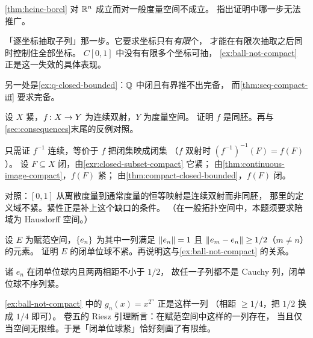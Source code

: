\begin{exercise}[结构]
  \label{exr:why-not-general}
  \cref{thm:heine-borel} 对 \(\mathbb{R}^{n}\) 成立而对一般度量空间不成立。
  指出证明中哪一步无法推广。
  \begin{solution}
    「逐坐标抽取子列」那一步。它要求坐标只有\emph{有限}个，
    才能在有限次抽取之后同时控制住全部坐标。
    \(C[0,1]\) 中没有有限多个坐标可抽，
    \cref{ex:ball-not-compact} 正是这一失效的具体表现。

    另一处是\cref{ex:q-closed-bounded}：\(\mathbb{Q}\) 中闭且有界推不出完备，
    而\cref{thm:seq-compact-iff} 要求完备。
  \end{solution}
\end{exercise}

\begin{exercise}[延伸]
  \label{exr:compact-homeo}
  设 \(X\) 紧，\(f \colon X \to Y\) 为连续双射，\(Y\) 为度量空间。
  证明 \(f\) 是同胚。再与\cref{sec:consequences}末尾的反例对照。
  \begin{solution}
    只需证 \(f^{-1}\) 连续，等价于 \(f\) 把闭集映成闭集
    （\(f\) 双射时 \((f^{-1})^{-1}(F) = f(F)\)）。
    设 \(F \subseteq X\) 闭，由\cref{exr:closed-subset-compact} 它紧；
    由\cref{thm:continuous-image-compact}，\(f(F)\) 紧；
    由\cref{thm:compact-closed-bounded}，\(f(F)\) 闭。

    对照：\([0,1]\) 从离散度量到通常度量的恒等映射是连续双射而非同胚，
    那里的定义域不紧。紧性正是补上这个缺口的条件。
    （在一般拓扑空间中，本题须要求陪域为 Hausdorff 空间。）
  \end{solution}
\end{exercise}

\begin{exercise}[延伸]
  \label{exr:riesz-preview}
  设 \(E\) 为赋范空间，\(\{e_{n}\}\) 为其中一列满足
  \(\lVert e_{n}\rVert=1\) 且 \(\lVert e_{m}-e_{n}\rVert \ge 1/2\)（\(m \neq n\)）的元素。
  证明 \(E\) 的闭单位球不紧。再说明这与\cref{ex:ball-not-compact} 的关系。
  \begin{solution}
    诸 \(e_{n}\) 在闭单位球内且两两相距不小于 \(1/2\)，
    故任一子列都不是 Cauchy 列，闭单位球不序列紧。

    \cref{ex:ball-not-compact} 中的 \(g_{n}(x)=x^{2^{n}}\) 正是这样一列
    （相距 \(\ge 1/4\)，把 \(1/2\) 换成 \(1/4\) 即可）。
    卷五的 Riesz 引理断言：在赋范空间中这样的一列存在，
    当且仅当空间无限维。于是「闭单位球紧」恰好刻画了有限维。
  \end{solution}
\end{exercise}

